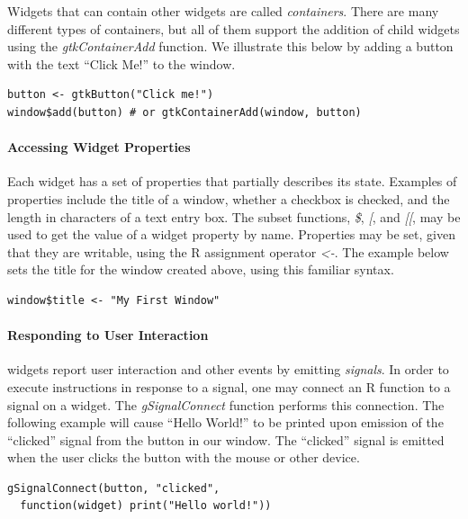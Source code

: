 \documentclass[article]{jss}
\begin{document}
Widgets that can contain other widgets are called \emph{containers}. There
are many different types of containers, but all of them support the addition
of child widgets using the \emph{gtkContainerAdd} function. We illustrate
this below by adding a button with the text ``Click Me!'' to the window.

\begin{verbatim}
button <- gtkButton("Click me!")
window$add(button) # or gtkContainerAdd(window, button)
\end{verbatim}

\paragraph{Accessing Widget Properties}

Each widget has a set of properties that partially describes its state. Examples
of properties include the title of a window, whether a checkbox is checked, and
the length in characters of a text entry box. The  subset functions, 
\emph{\$}, \emph{[}, and \emph{[[}, may be used to get the value 
of a widget property by name. Properties
may be set, given that they are writable, using the R assignment operator \emph{<-}.
The example below sets the title for the window created above, using this
familiar  syntax.

\begin{verbatim}
window$title <- "My First Window"
\end{verbatim}

\paragraph{Responding to User Interaction}

 widgets report user interaction and other events by emitting 
\emph{signals}. In order to execute instructions in response to a signal, one
may connect an R function to a signal on a widget. The \emph{gSignalConnect}
function performs this connection. The following example will
cause ``Hello World!'' to be printed upon emission of the ``clicked'' signal
from the button in our window. The ``clicked'' signal is emitted when 
the user clicks the button with the mouse or other device.

\begin{verbatim}
gSignalConnect(button, "clicked", 
  function(widget) print("Hello world!"))
\end{verbatim}
\end{document}
